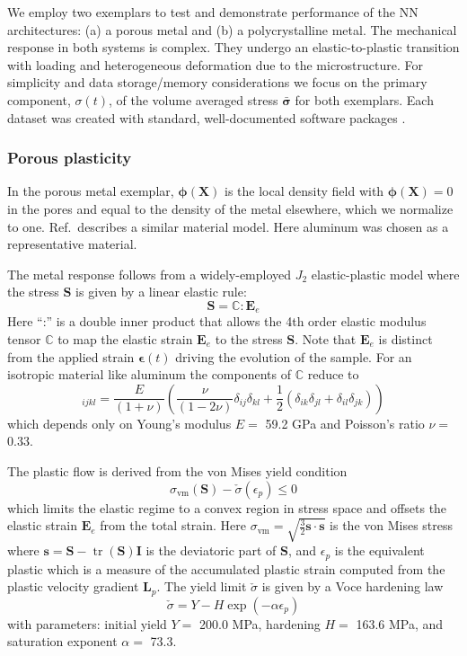 \documentclass[12pt,reqno]{article}
\newcommand{\ADD}[1]{{#1}}
\newcommand{\cref}[1]{Ref.\,\cite{#1}}
\newcommand{\Cbb}{\mathbb{C}}
\renewcommand{\sb}{\mathbf{s}}
\newcommand{\Eb}{\mathbf{E}}
\newcommand{\Lb}{\mathbf{L}}
\newcommand{\Ib}{\mathbf{I}}
\newcommand{\Sb}{\mathbf{S}}
\newcommand{\Xb}{\mathbf{X}}
\newcommand{\epsilonb}{{\boldsymbol{\epsilon}}}
\newcommand{\sigmab}{{\boldsymbol{\sigma}}}
\newcommand{\phib}{{\boldsymbol{\phi}}}
\newcommand{\tr}{{\operatorname{tr}}}
\begin{document}
\ADD{
We employ two exemplars to test and demonstrate performance of the NN architectures: (a) a porous metal and (b) a polycrystalline metal.
The mechanical response in both systems is complex.
They undergo an elastic-to-plastic transition with loading and heterogeneous deformation due to the microstructure.
For simplicity and data storage/memory considerations we focus on the primary component, $\sigma(t)$, of the volume averaged stress $\bar{\sigmab}$ for both exemplars.
Each dataset was created with standard, well-documented software packages \cite{dream3d,albany,sierra}.
}

\subsubsection{\ADD{Porous plasticity}}\label{sec:porous_plasticity}

\ADD{
In the porous metal exemplar, $\phib(\Xb)$ is the local density field with $\phib(\Xb) = 0$ in the pores and equal to the density of the metal elsewhere, which we normalize to one.
\cref{rizzi2018bayesian} describes a similar material model.
Here aluminum was chosen as a representative material.
}

\ADD{
The metal response follows from a widely-employed $J_2$ elastic-plastic model \cite{lubliner2008plasticity} where the stress $\Sb$ is given by a linear elastic rule:
\begin{equation} \label{eq:stress}
\Sb = \Cbb : \Eb_e
\end{equation}
Here ``:'' is a double inner product that allows the 4th order elastic modulus tensor $\Cbb$ to map the elastic strain $\Eb_e$ to the stress $\Sb$.
Note that $\Eb_e$ is distinct from the applied strain $\epsilonb(t)$ driving the evolution of the sample.
For an isotropic material like aluminum the components of $\Cbb$ reduce to
\begin{equation}
[ \Cbb ]_{ijkl} = \frac{E}{(1+\nu)} \left( \frac{\nu}{(1-2\nu)} \delta_{ij}\delta_{kl} + \frac{1}{2} (\delta_{ik}\delta_{jl} + \delta_{il}\delta_{jk}) \right)
\end{equation}
which depends only on Young's modulus $E=$ 59.2 GPa and Poisson's ratio $\nu=$ 0.33.
}

\ADD{
The plastic flow is derived from the von Mises yield condition
\begin{equation}
\sigma_\text{vm}(\Sb) - \check{\sigma}(\epsilon_p) \le 0
\end{equation}
which limits the elastic regime to a convex region in stress space and offsets the elastic strain $\Eb_e$ from the total strain.
Here $\sigma_\text{vm} = \sqrt{\frac{3}{2} \sb\cdot\sb}$ is the von Mises stress where $\sb = \Sb - \tr(\Sb) \Ib$ is the deviatoric part of $\Sb$, and $\epsilon_p$ is the equivalent plastic which is a measure of the accumulated plastic strain computed from the plastic velocity gradient $\Lb_p$.
The yield limit $\check{\sigma}$ is given by a Voce hardening law
\begin{equation}
\check{\sigma} = Y - H \exp(-\alpha \epsilon_p)
\end{equation}
with parameters: initial yield $Y=$ 200.0 MPa, hardening $H=$ 163.6 MPa, and saturation exponent $\alpha=$ 73.3.
}
\end{document}
